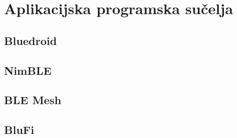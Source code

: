 \chapter{Aplikacijska programska sučelja}

\section{Bluedroid}

\section{NimBLE}

\section{BLE Mesh}

\section{BluFi}

\eject